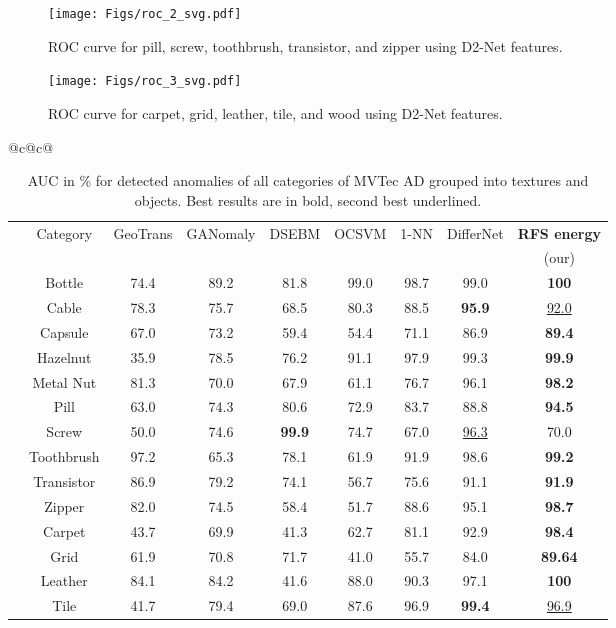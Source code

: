 \documentclass[journal]{IEEEtran}
\let\MYoriglatexcaption\caption
\renewcommand{\caption}[2][\relax]{\MYoriglatexcaption[#2]{#2}}
\begin{document}
\begin{figure}[!ht]
\centering
    \texttt{[image: Figs/roc\_2\_svg.pdf]}
      \caption{ROC curve for pill, screw, toothbrush, transistor, and zipper using D2-Net features.}
    \label{fig:ROC_curve_mvtec_2}
\end{figure}
\begin{figure}[!ht]
\centering
     \texttt{[image: Figs/roc\_3\_svg.pdf]}
    \caption{ROC curve for carpet, grid, leather, tile, and wood using D2-Net features.}
    \label{fig:ROC_curve_mvtec_3}
\end{figure}

\begin{table*}[!h]
	\caption{AUC in \% for detected anomalies of all categories of MVTec AD grouped into textures and objects. Best results are in bold, second best underlined.}
	\label{Tab:MVTec_AUC}
	\centering
\begin{tabular}{@{}c@{}c@{}} \begin{tabular}{ccccccccc}
		    \toprule
		& Category & GeoTrans & GANomaly & DSEBM & OCSVM & 1-NN & DifferNet & \textbf{RFS energy}\\
		& & \cite{geotrans} &\cite{akcay2018ganomaly}  & \cite{dsebm} & \cite{andrews}& \cite{nazare}&\cite{rudolph2021same} &(our)\\
		\cline{2-9}


		& Bottle     & 74.4 & 89.2 & 81.8 & 99.0& 98.7 & 99.0  &\textbf{100}\\
		& Cable      & 78.3 & 75.7 & 68.5 & 80.3 & 88.5 & \textbf{95.9} &\underline{92.0}\\
		& Capsule    & 67.0 & 73.2 & 59.4 & 54.4 & 71.1 & 86.9 &\textbf{89.4}\\
		& Hazelnut   & 35.9 & 78.5 & 76.2 & 91.1 & 97.9 & 99.3 &\textbf{99.9}\\
		& Metal Nut  & 81.3 & 70.0 & 67.9 & 61.1 & 76.7 & 96.1 &\textbf{98.2}\\
		\rotatebox[origin=c]{90}{\parbox[c]{0cm}{Objects}}& Pill       & 63.0 & 74.3 & 80.6 & 72.9 & 83.7 & 88.8 &\textbf{94.5}\\
		& Screw      & 50.0 & 74.6 & \textbf{99.9} & 74.7 & 67.0 & \underline{96.3} &70.0\\
		& Toothbrush & 97.2 & 65.3 & 78.1 & 61.9 & 91.9 & 98.6 &\textbf{99.2}\\
		& Transistor &86.9 & 79.2 & 74.1 & 56.7 & 75.6 & 91.1 &\textbf{91.9}\\
		& Zipper     & 82.0 & 74.5 & 58.4 & 51.7 & 88.6 & 95.1 &\textbf{98.7}\\
\cline{2-9}
		& Carpet     & 43.7 & 69.9 & 41.3 & 62.7 & 81.1 & 92.9 &\textbf{98.4}\\
		& Grid       & 61.9 & 70.8 & 71.7 & 41.0 & 55.7 & 84.0 &\textbf{89.64}\\
		& Leather    & 84.1 & 84.2 & 41.6 & 88.0 & 90.3 & 97.1 &\textbf{100}\\
		& Tile       & 41.7 & 79.4 & 69.0 & 87.6 & 96.9 & \textbf{99.4} &\underline{96.9}\\
		

\end{tabular}
\end{tabular}
\end{table*}
\end{document}
